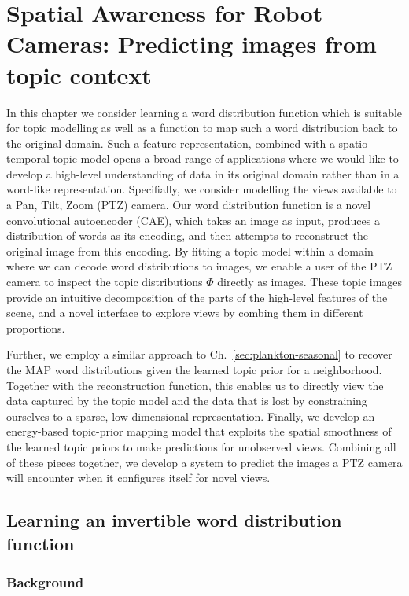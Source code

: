 
\chapter{Spatial Awareness for Robot Cameras: Predicting images from topic context} \label{ch:spatial-prediction}

In this chapter we consider learning a word distribution function which is suitable for topic modelling as well as a function to map such a word distribution back to the original domain. Such a feature representation, combined with a spatio-temporal topic model opens a broad range of applications where we would like to develop a high-level understanding of data in its original domain rather than in a word-like representation. Specifially, we consider modelling the views available to a Pan, Tilt, Zoom (PTZ) camera. Our word distribution function is a novel convolutional autoencoder (CAE), which takes an image as input, produces a distribution of words as its encoding, and then attempts to reconstruct the original image from this encoding. By fitting a topic model within a domain where we can decode word distributions to images, we enable a user of the PTZ camera to inspect the topic distributions $\Phi$ directly as images. These topic images provide an intuitive decomposition of the parts of the high-level features of the scene, and a novel interface to explore views by combing them in different proportions.

Further, we employ a similar approach to Ch.~\ref{sec:plankton-seasonal} to recover the MAP word distributions given the learned topic prior for a neighborhood. Together with the reconstruction function, this enables us to directly view the data captured by the topic model and the data that is lost by constraining ourselves to a sparse, low-dimensional representation. Finally, we develop an energy-based topic-prior mapping model that exploits the spatial smoothness of the learned topic priors to make predictions for unobserved views. Combining all of these pieces together, we develop a system to predict the images a PTZ camera will encounter when it configures itself for novel views.

\section{Learning an invertible word distribution function} \label{sec:learning-features}

\subsection{Background}

